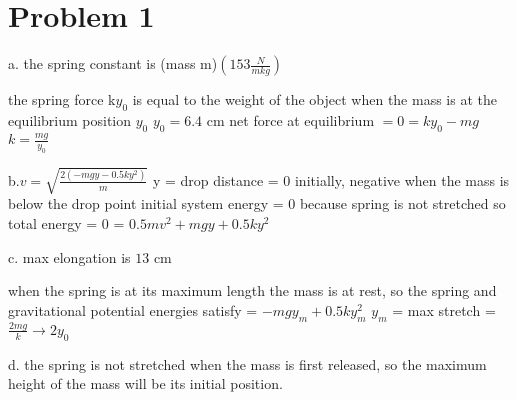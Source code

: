 \chapter{Problem 1}
\label{Problem 1}
a. the spring constant is (mass m)$(153 \frac{N}{m kg})$\newline

the spring force k$y_{0}$ is equal to the weight of the object\newline
when the mass is at the equilibrium position $y_{0}$\newline
$y_{0} = 6.4$ cm\newline
net force at equilibrium $= 0 = ky_{0} - mg$\newline
$k = \frac{mg}{y_{0}}$\newline

b.$v = \sqrt{\frac{2(-mgy - 0.5ky^{2})}{m}}$ \newline
y = drop distance = $0$ initially, negative when the mass\newline
is below the drop point\newline
initial system energy = 0 because spring is not stretched\newline
so total energy = 0 = $0.5mv^{2} + mgy + 0.5ky^{2}$\newline
                                                      
c. max elongation is $13$ cm\newline

when the spring is at its maximum length the mass is\newline
at rest, so the spring and gravitational potential\newline
energies satisfy = $-mgy_{m} + 0.5ky_{m}^{2}$\newline
$y_{m}$ = max stretch = $\frac{2mg}{k} \rightarrow 2y_{0}$\newline
                                                                          
d. the spring is not stretched when the mass is first\newline
released, so the maximum height of the mass will be\newline
its initial position.

